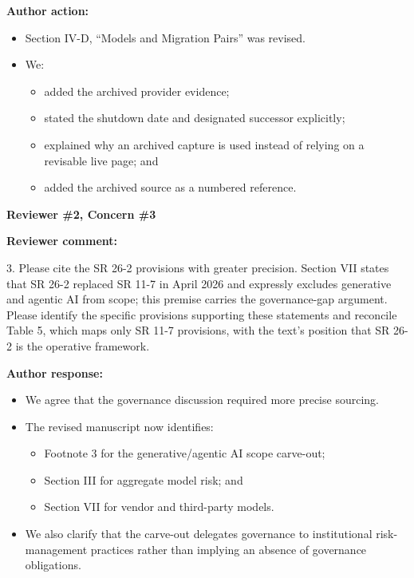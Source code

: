 \documentclass[11pt]{article}
\newcommand{\rvcomment}[1]{{\color{ReviewerGreen}#1}}
\newcommand{\concern}[1]{\textbf{\color{ReviewerGreen}#1}}
\begin{document}
\textbf{Author action:}

\begin{itemize}

\item Section IV-D, ``Models and Migration Pairs'' was revised.

\item We:

\begin{itemize}

\item added the archived provider evidence;

\item stated the shutdown date and designated successor explicitly;

\item explained why an archived capture is used instead of relying on a revisable live page; and

\item added the archived source as a numbered reference.

\end{itemize}

\end{itemize}

\vspace{12pt}
\concern{Reviewer \#2, Concern \#3}

\concern{Reviewer comment:}

\rvcomment{3. Please cite the SR 26-2 provisions with greater precision. Section VII states that SR 26-2 replaced SR 11-7 in April 2026 and expressly excludes generative and agentic AI from scope; this premise carries the governance-gap argument. Please identify the specific provisions supporting these statements and reconcile Table 5, which maps only SR 11-7 provisions, with the text's position that SR 26-2 is the operative framework.}

\textbf{Author response:}

\begin{itemize}

\item We agree that the governance discussion required more precise sourcing.

\item The revised manuscript now identifies:

\begin{itemize}

\item Footnote 3 for the generative/agentic AI scope carve-out;

\item Section III for aggregate model risk; and

\item Section VII for vendor and third-party models.

\end{itemize}

\item We also clarify that the carve-out delegates governance to institutional risk-management practices rather than implying an absence of governance obligations.

\end{itemize}
\end{document}
